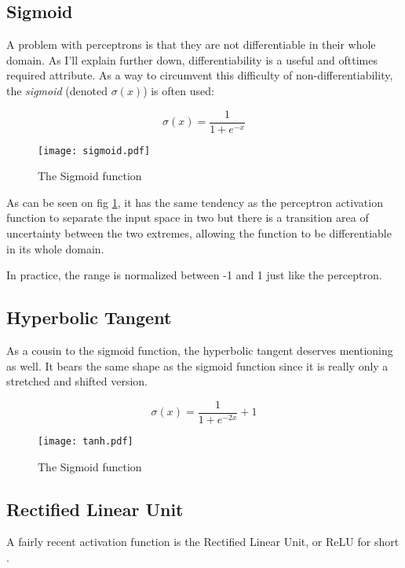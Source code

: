 \subsection{Sigmoid}
A problem with perceptrons
is that they are not differentiable
in their whole domain.
As I'll explain further down, %
differentiability is a useful and ofttimes required attribute.
As a way to circumvent this difficulty of non-differentiability,
the \textit{sigmoid} (denoted $\sigma(x)$) is often used:

\begin{equation}
\label{eq.ml.sigmoid}
\sigma(x) = \frac{1}{1 + e^{-x}}
\end{equation}

\begin{figure}[h]
\center
\texttt{[image: sigmoid.pdf]}
\caption{The Sigmoid function}
\label{fig.ml.sigmoid}
\end{figure}

As can be seen on fig \ref{fig.ml.sigmoid},
it has the same tendency as the perceptron activation function
to separate the input space in two
but there is a transition area of uncertainty between the two extremes,
allowing the function to be differentiable in its whole domain.

In practice, the range is normalized between -1 and 1
just like the perceptron.

\subsection{Hyperbolic Tangent}
As a cousin to the sigmoid function, the hyperbolic tangent
deserves mentioning as well.
It bears the same shape as the sigmoid function
since it is really only a stretched
and shifted version.

\begin{equation}
\label{eq.ml.tanh}
\sigma(x) = \frac{1}{1 + e^{-2x}}+1
\end{equation}

\begin{figure}[h]
\center
\texttt{[image: tanh.pdf]}
\caption{The Sigmoid function}
\label{fig.ml.htan}
\end{figure}

\subsection{Rectified Linear Unit}
A fairly recent activation function is the
Rectified Linear Unit, or ReLU for short
\parencite{Nair2010}.

